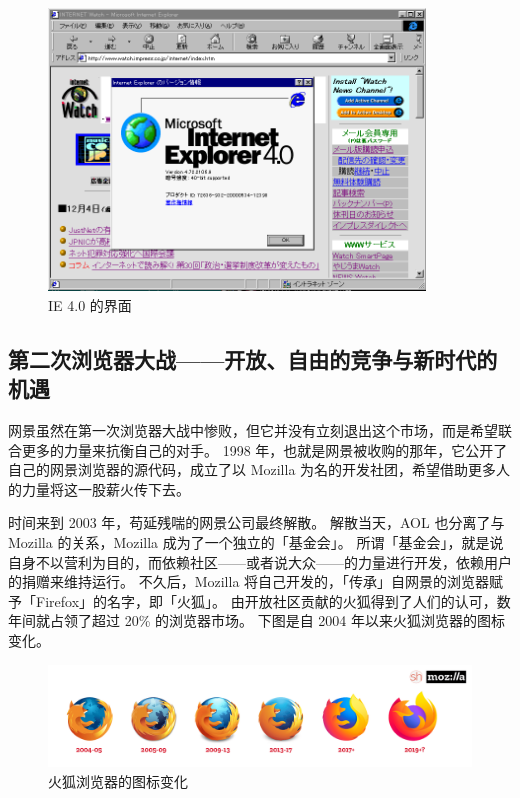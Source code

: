 \begin{figure}[htb!]
  \centering
  \includegraphics[width=10cm]{assets/IE_4.png}
  \caption{IE 4.0 的界面}
  \label{IE_4}
\end{figure}

\subsection[第二次浏览器大战——开放、自由的竞争与新时代的机遇]{第二次浏览器大战{\normalsize ——开放、自由的竞争与新时代的机遇}}

网景虽然在第一次浏览器大战中惨败，但它并没有立刻退出这个市场，而是希望联合更多的力量来抗衡自己的对手。
1998 年，也就是网景被收购的那年，它公开了自己的网景浏览器的源代码，成立了以 Mozilla 为名的开发社团，希望借助更多人的力量将这一股薪火传下去。

时间来到 2003 年，苟延残喘的网景公司最终解散。
解散当天，AOL 也分离了与 Mozilla 的关系，Mozilla 成为了一个独立的「基金会」。
所谓「基金会」，就是说自身不以营利为目的，而依赖社区——或者说大众——的力量进行开发，依赖用户的捐赠来维持运行。
不久后，Mozilla 将自己开发的，「传承」自网景的浏览器赋予「Firefox」的名字，即「火狐」。
由开放社区贡献的火狐得到了人们的认可，数年间就占领了超过 20\% 的浏览器市场。
下图是自 2004 年以来火狐浏览器的图标变化。

\begin{figure}[htb!]
  \centering
  \includegraphics[width=12cm]{assets/Firefox_Logo_History.png}
  \caption{火狐浏览器的图标变化}
  \label{Firefox_Logo_History}
\end{figure}

